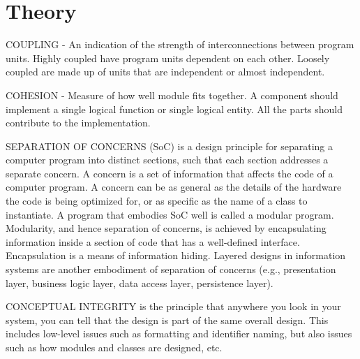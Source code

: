 \documentclass[12pt,a4paper,titlepage]{article}
\begin{document}
\section{Theory}

COUPLING - An indication of the strength of interconnections between program units.
Highly coupled have program units dependent on each other. Loosely coupled are made up of units that are independent or almost independent.\par

COHESION - Measure of how well module fits together.
A component should implement a single logical function or single logical entity. All the parts should contribute to the implementation.\par
SEPARATION OF CONCERNS (SoC) is a design principle for separating a computer program into distinct sections, such that each section addresses a separate concern. A concern is a set of information that affects the code of a computer program. A concern can be as general as the details of the hardware the code is being optimized for, or as specific as the name of a class to instantiate. A program that embodies SoC well is called a modular program. Modularity, and hence separation of concerns, is achieved by encapsulating information inside a section of code that has a well-defined interface. Encapsulation is a means of information hiding. Layered designs in information systems are another embodiment of separation of concerns (e.g., presentation layer, business logic layer, data access layer, persistence layer).\par

CONCEPTUAL INTEGRITY is the principle that anywhere you look in your system, you can tell that the design is part of the same overall design. This includes low-level issues such as formatting and identifier naming, but also issues such as how modules and classes are designed, etc.\par


\clearpage
\end{document}
